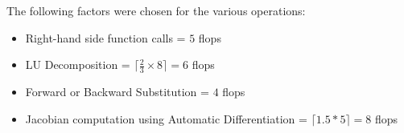 \documentclass[notitlepage,12pt]{article}
\begin{document}
The following factors were chosen for the various operations:\\
\begin{itemize}
\item Right-hand side function calls = $5$ flops
\item LU Decomposition = $\lceil \frac{2}{3}\times 8\rceil = 6$ flops
\item Forward or Backward Substitution = $4$ flops
\item Jacobian computation using Automatic Differentiation = $\lceil 1.5*5 \rceil = 8$ flops
\end{itemize}
















\end{document}
